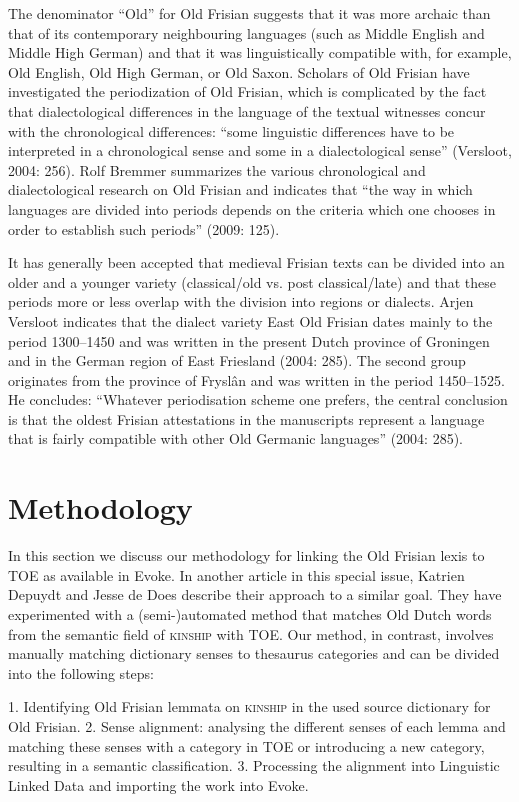 The denominator “Old” for Old Frisian suggests that it was more archaic than that of its contemporary neighbouring languages (such as Middle English and Middle High German) and that it was linguistically compatible with, for example, Old English, Old High German, or Old Saxon. Scholars of Old Frisian have investigated the periodization of Old Frisian, which is complicated by the fact that dialectological differences in the language of the textual witnesses concur with the chronological differences: “some linguistic differences have to be interpreted in a chronological sense and some in a dialectological sense” (Versloot, 2004: 256). Rolf Bremmer summarizes the various chronological and dialectological research on Old Frisian and indicates that “the way in which languages are divided into periods depends on the criteria which one chooses in order to establish such periods” (2009: 125).

It has generally been accepted that medieval Frisian texts can be divided into an older and a younger variety (classical/old vs. post classical/late)  and that these periods more or less overlap with the division into regions or dialects. Arjen Versloot indicates that the dialect variety East Old Frisian dates mainly to the period 1300–1450 and was written in the present Dutch province of Groningen and in the German region of East Friesland (2004: 285). The second group originates from the province of Fryslân and was written in the period 1450–1525. He concludes: “Whatever periodisation scheme one prefers, the central conclusion is that the oldest Frisian attestations in the manuscripts represent a language that is fairly compatible with other Old Germanic languages” (2004: 285).


\section{Methodology}
\label{sect:Stolk2021b:Methodology}

In this section we discuss our methodology for linking the Old Frisian lexis to TOE as available in Evoke. In another article in this special issue, Katrien Depuydt and Jesse de Does describe their approach to a similar goal. They have experimented with a (semi-)automated method that matches Old Dutch words from the semantic field of \textsc{kinship} with TOE. Our method, in contrast, involves manually matching dictionary senses to thesaurus categories and can be divided into the following steps:

1.	Identifying Old Frisian lemmata on \textsc{kinship} in the used source dictionary for Old Frisian.
2.	Sense alignment: analysing the different senses of each lemma and matching these senses with a category in TOE or introducing a new category, resulting in a semantic classification.
3.	Processing the alignment into Linguistic Linked Data and importing the work into Evoke.

